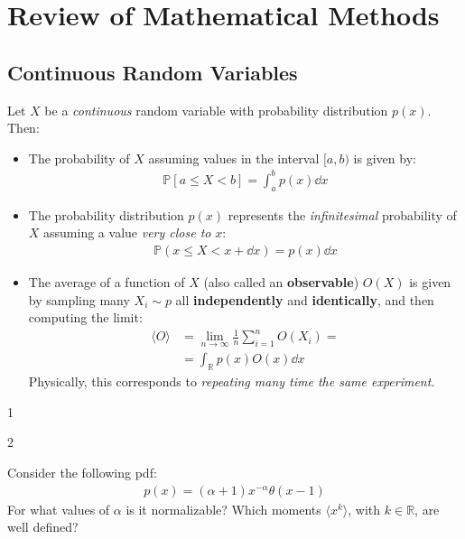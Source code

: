 \documentclass[../template.tex]{subfiles}
\begin{document}
\section{Review of Mathematical Methods}
\subsection{Continuous Random Variables}
Let $X$ be a \textit{continuous} random variable with probability distribution $p(x)$. Then:
\begin{itemize}
    \item The probability of $X$ assuming values in the interval $[a,b)$ is given by:
    \begin{align*}
        \mathbb{P}[a \leq X < b] = \int_a^b p(x) \dd{x}
    \end{align*}
    \item The probability distribution $p(x)$ represents the \textit{infinitesimal} probability of $X$ assuming a value \textit{very close to} $x$:
    \begin{align*}
        \mathbb{P}(x \leq X < x+ \dd{x}) = p(x) \dd{x}
    \end{align*} 
    \item The average of a function of $X$ (also called an \textbf{observable}) $O(X)$ is given by sampling many $X_i \sim p$ all \textbf{independently} and \textbf{identically}, and then computing the limit:
    \begin{align*}
        \langle O \rangle &= \lim_{n \to \infty} \frac{1}{n} \sum_{i=1}^n O(X_i) =\\
        &= \int_{\mathbb{R}} p(x) O(x) \dd{x} 
    \end{align*}  
    Physically, this corresponds to \textit{repeating many time the same experiment}. 
\end{itemize}
 
\begin{example}
    
\end{example}

\begin{exo}
    1
\end{exo}

\begin{exo}
    2
\end{exo}

\begin{exo}
    Consider the following pdf:
    \begin{align*}
        p(x) = (\alpha + 1) x^{-\alpha} \theta(x-1)
    \end{align*}
    For what values of $\alpha$ is it normalizable? Which moments $\langle x^k \rangle$, with $k \in \mathbb{R}$, are well defined?
\end{exo}
\end{document}
